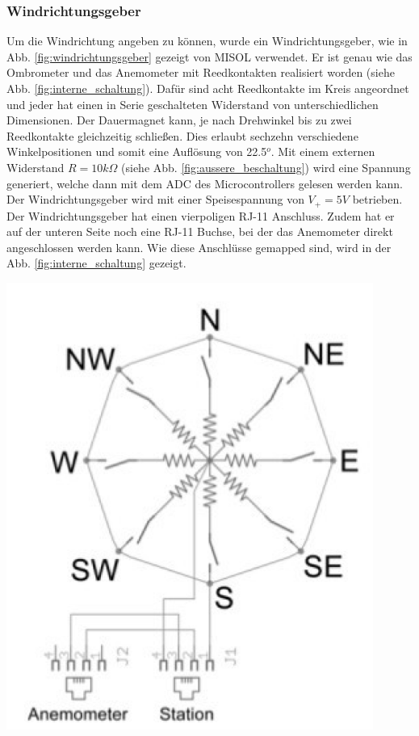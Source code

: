 \subsubsection{Windrichtungsgeber}
{\begin{minipage}[b][10cm][t]{0.55\textwidth}
Um die Windrichtung angeben zu können, wurde ein Windrichtungsgeber, wie in Abb. \ref{fig:windrichtungsgeber} gezeigt von MISOL verwendet. Er ist genau wie das Ombrometer und das Anemometer mit Reedkontakten realisiert worden (siehe Abb. \ref{fig:interne_schaltung}). Dafür sind acht Reedkontakte im Kreis angeordnet und jeder hat einen in Serie geschalteten Widerstand von unterschiedlichen Dimensionen. Der Dauermagnet kann, je nach Drehwinkel bis zu zwei Reedkontakte gleichzeitig schließen. Dies erlaubt sechzehn verschiedene Winkelpositionen und somit eine Auflösung von 22.5$^{o}$. Mit einem externen Widerstand $R=10k\Omega$ (siehe Abb. \ref{fig:aussere_beschaltung}) wird eine Spannung generiert, welche dann mit dem ADC des Microcontrollers gelesen werden kann. Der Windrichtungsgeber wird mit einer Speisespannung von $V_{+}=5V$ betrieben. Der Windrichtungsgeber hat einen vierpoligen RJ-11 Anschluss. Zudem hat er auf der unteren Seite noch eine RJ-11 Buchse, bei der das Anemometer direkt angeschlossen werden kann. Wie diese Anschlüsse gemapped sind, wird in der Abb. \ref{fig:interne_schaltung} gezeigt. \\
\end{minipage}}
{\begin{minipage}[b][10cm][t]{0.44\textwidth}
\centering
\includegraphics[width=0.9\textwidth]{graphics/windrichtungsgeber/interne_schaltung.PNG}
\label{fig:interne_schaltung}
\end{minipage}}

